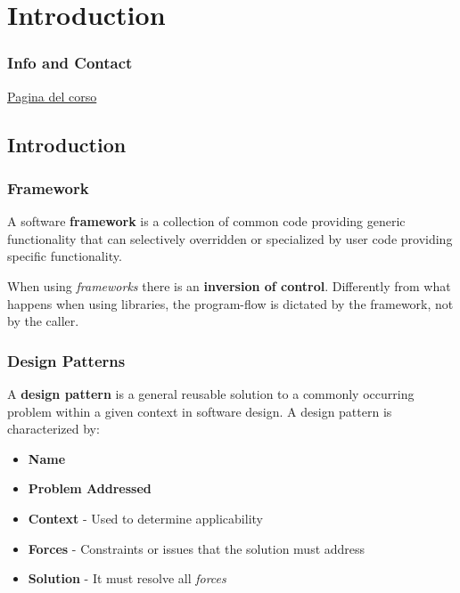 \chapter{Introduction}
\subsection*{Info and Contact}

\href{https://pages.di.unipi.it/corradini/Didattica/AP-23/}{Pagina del corso}
\section{Introduction}
\subsection{Framework}
A software \textbf{framework} is a collection of common code providing generic functionality that can selectively overridden or specialized by user code providing specific functionality.

When using \textit{frameworks} there is an \textbf{inversion of control}.
Differently from what happens when using libraries,
the program-flow is dictated by the framework, not by the caller.

\subsection{Design Patterns}
A \textbf{design pattern} is a general reusable solution to a commonly occurring problem within a given context in software design. 
A design pattern is characterized by:
\begin{itemize}
    \item \textbf{Name}
	\item \textbf{Problem Addressed}
	\item \textbf{Context} - Used to determine applicability
	\item \textbf{Forces} - Constraints or issues that the solution must address
	\item \textbf{Solution} - It must resolve all \textit{forces}
\end{itemize}

